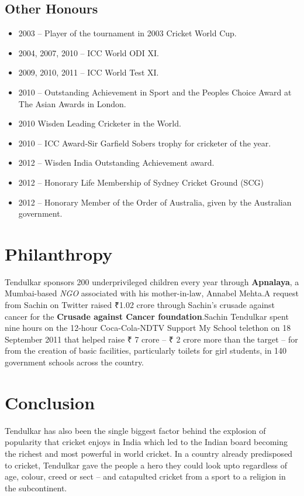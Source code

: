 \documentclass{article}
\begin{document}
\subsection{Other Honours \cite{wiki}}
\begin{itemize}
\item 2003 – Player of the tournament in 2003 Cricket World Cup.
\item 2004, 2007, 2010 – ICC World ODI XI.
\item 2009, 2010, 2011 – ICC World Test XI.
\item 2010 – Outstanding Achievement in Sport and the Peoples Choice Award at The Asian Awards in London.
\item 2010  Wisden Leading Cricketer in the World.
\item 2010 – ICC Award-Sir Garfield Sobers trophy for cricketer of the year.
\item 2012 – Wisden India Outstanding Achievement award.
\item 2012 – Honorary Life Membership of Sydney Cricket Ground (SCG)
\item 2012 – Honorary Member of the Order of Australia, given by the Australian government.
\end{itemize}

\section{Philanthropy}
Tendulkar sponsors 200  underprivileged children every year through \textbf{Apnalaya}, a Mumbai-based \textit{NGO} associated with his mother-in-law, Annabel Mehta.A request from Sachin on Twitter raised ₹1.02 crore through Sachin's crusade against  cancer for the \textbf{Crusade against Cancer foundation}.Sachin Tendulkar spent nine hours on the 12-hour Coca-Cola-NDTV Support My School  telethon on 18 September 2011 that helped raise ₹ 7 crore – ₹ 2 crore more than the target – for from the creation of basic facilities, particularly toilets for girl students, in 140 government schools across the country.\cite{wiki}

\section{Conclusion}
Tendulkar has also been the single biggest factor behind the explosion of popularity that cricket enjoys in India which led to the Indian  board becoming the richest and most powerful in world cricket. In a country already predisposed to cricket, Tendulkar gave the people a hero they could look upto regardless of age, colour, creed or sect -- and catapulted cricket from a sport to a  religion in the  subcontinent. \cite{cric}


\newpage
{}
\printindex
\end{document}
